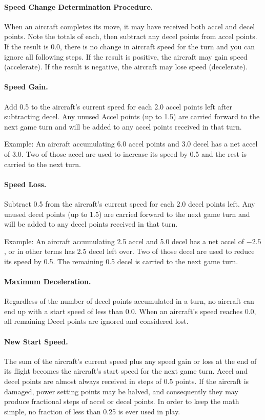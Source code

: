 \paragraph{Speed Change Determination Procedure.} When an aircraft completes its move, it may have received both accel and decel points. Note the totals of each, then subtract any decel points from accel points. If the result is 0.0, there is no change in aircraft speed for the turn and you can ignore all following steps. If the result is positive, the aircraft may gain speed (accelerate). If the result is negative, the aircraft may lose speed (decelerate).

\paragraph{Speed Gain.}
Add 0.5 to the aircraft's current speed for each 2.0 accel points left after subtracting decel.  Any unused Accel points (up to 1.5) are carried forward to the next game turn and will be added to any accel points received in that turn.

Example: An aircraft accumulating 6.0 accel points and 3.0 decel has a net accel of 3.0. Two of those accel are used to increase its speed by 0.5 and the rest is carried to the next turn.

\paragraph{Speed Loss.} 
Subtract 0.5 from the aircraft's current speed for each 2.0 decel points left. Any unused decel points (up to 1.5) are carried forward to the next game turn and will be added to any decel points received in that turn.

Example: An aircraft accumulating 2.5 accel and 5.0 decel has a net accel of $-2.5$, or in other terms has 2.5 decel left over. Two of those decel are used to reduce its speed by 0.5. The remaining 0.5 decel is carried to the next game turn.

\paragraph{Maximum Deceleration.} 
Regardless of the number of decel points accumulated in a turn, no aircraft can end up with a start speed of less than 0.0. When an aircraft's speed reaches 0.0, all remaining Decel points are ignored and considered lost.

\paragraph{New Start Speed.} 
The sum of the aircraft's current speed plus any speed gain or loss at the end of its flight becomes the aircraft's start speed for the next game turn. Accel and decel points are almost always received in steps of 0.5 points. If the aircraft is damaged, power setting points may be halved, and consequently they may produce fractional steps of accel or decel points. In order to keep the math simple, no fraction of less than 0.25 is ever used in play.


